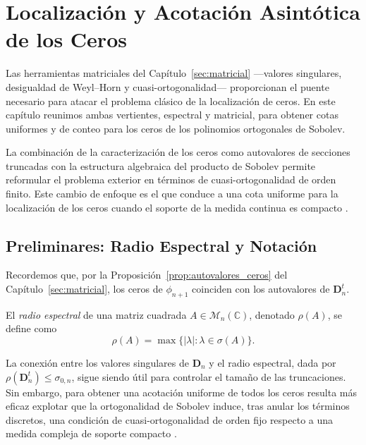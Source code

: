 \chapter{Localización y Acotación Asintótica de los Ceros}\label{sec:ceros_acotacion}

Las herramientas matriciales del Capítulo~\ref{sec:matricial} ---valores singulares, desigualdad de Weyl--Horn y cuasi-ortogonalidad--- proporcionan el puente necesario para atacar el problema clásico de la localización de ceros. En este capítulo reunimos ambas vertientes, espectral y matricial, para obtener cotas uniformes y de conteo para los ceros de los polinomios ortogonales de Sobolev.

La combinación de la caracterización de los ceros como autovalores de secciones truncadas con la estructura algebraica del producto de Sobolev permite reformular el problema exterior en términos de cuasi-ortogonalidad de orden finito. Este cambio de enfoque es el que conduce a una cota uniforme para la localización de los ceros cuando el soporte de la medida continua es compacto \cite{lopez1999zero,lopez2001sobolev,marcellan2015sobolev}.

\section{Preliminares: Radio Espectral y Notación}

Recordemos que, por la Proposición~\ref{prop:autovalores_ceros} del Capítulo~\ref{sec:matricial}, los ceros de $\phi_{n+1}$ coinciden con los autovalores de $\mathbf{D}_n^t$.

\begin{defn}\label{def:radio_espectral}
	El \emph{radio espectral} de una matriz cuadrada $A \in \mathcal{M}_n(\mathbb{C})$, denotado $\rho(A)$, se define como
	\[
		\rho(A) = \max\{|\lambda| : \lambda \in \sigma(A)\}.
	\]
\end{defn}

La conexión entre los valores singulares de $\mathbf{D}_n$ y el radio espectral, dada por $\rho(\mathbf{D}_n^t) \le \sigma_{0,n}$, sigue siendo útil para controlar el tamaño de las truncaciones. Sin embargo, para obtener una acotación uniforme de todos los ceros resulta más eficaz explotar que la ortogonalidad de Sobolev induce, tras anular los términos discretos, una condición de cuasi-ortogonalidad de orden fijo respecto a una medida compleja de soporte compacto \cite{lopez1999zero,marcellan2015sobolev}.

